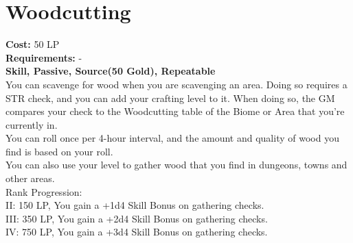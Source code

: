 \section{Woodcutting}\label{perk:woodcutting}
\textbf{Cost:} 50 LP\\
\textbf{Requirements:} -\\
\textbf{Skill, Passive, Source(50 Gold), Repeatable}\\
You can scavenge for wood when you are scavenging an area.
Doing so requires a STR check, and you can add your crafting level to it.
When doing so, the GM compares your check to the Woodcutting table of the Biome or Area that you're currently in.\\
You can roll once per 4-hour interval, and the amount and quality of wood you find is based on your roll.\\
You can also use your level to gather wood that you find in dungeons, towns and other areas.
\\
Rank Progression:\\
II: 150 LP, You gain a +1d4 Skill Bonus on gathering checks.\\
III: 350 LP, You gain a +2d4 Skill Bonus on gathering checks.\\
IV: 750 LP, You gain a +3d4 Skill Bonus on gathering checks.\\